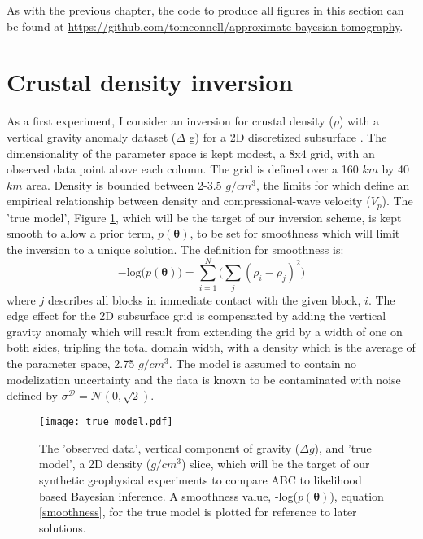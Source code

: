 As with the previous chapter, the code to produce all figures in this section can be found at \url{https://github.com/tomconnell/approximate-bayesian-tomography}.\par


\section{Crustal density inversion}

As a first experiment, I consider an inversion for crustal density ($\rho$) with a vertical gravity anomaly dataset ($\Delta$ g) for a 2D discretized subsurface \citep[p.184-195,378]{blakely1996}. The dimensionality of the parameter space is kept modest, a 8x4 grid, with an observed data point above each column. The grid is defined over a 160 $km$ by 40 $km$ area. Density is bounded between 2-3.5 $g/cm^3$, the limits for which \citet{Brocher2005} define an empirical relationship between density and compressional-wave velocity ($V_p$). The 'true model', Figure \ref{true_model}, which will be the target of our inversion scheme, is kept smooth to allow a prior term, $p(\bm{\theta})$, to be set for smoothness which will limit the inversion to a unique solution. The definition for smoothness is:
\begin{equation}
-\text{log}\big(p(\bm{\theta})\big) = \sum_{i = 1}^{N} \Big(\sum_{j} (\rho_i - \rho_j)^2\Big)
\label{smoothness}
\end{equation}
where $j$ describes all blocks in immediate contact with the given block, $i$. The edge effect for the 2D subsurface grid is compensated by adding the vertical gravity anomaly which will result from extending the grid by a width of one on both sides, tripling the total domain width, with a density which is the average of the parameter space, 2.75 $g/cm^3$. The model is assumed to contain no modelization uncertainty and the data is known to be contaminated with noise defined by $\sigma^{\mathcal{D}} = \mathcal{N}(0,\sqrt{2})$.
\begin{figure}[H]
	\centering
	\texttt{[image: true\_model.pdf]}
	\caption{The 'observed data', vertical component of gravity ($\Delta g$), and 'true model', a 2D density ($g/cm^3$) slice, which will be the target of our synthetic geophysical experiments to compare ABC to likelihood based Bayesian inference. A smoothness value, -log($p(\bm{\theta})$), equation \ref{smoothness}, for the true model is plotted for reference to later solutions.}
	\label{true_model}
\end{figure}
